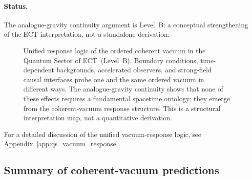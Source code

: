 \paragraph{Status.}
The analogue-gravity continuity argument is Level~B: a conceptual
strengthening of the ECT interpretation, not a standalone derivation.

\begin{figure}[h]
\centering
{}
\caption{Unified response logic of the ordered coherent vacuum
in the Quantum Sector of ECT~(Level~B).
Boundary conditions, time-dependent backgrounds, accelerated observers,
and strong-field causal interfaces probe one and the same ordered vacuum
in different ways.
The analogue-gravity continuity shows that none of these effects requires
a fundamental spacetime ontology; they emerge from the coherent-vacuum
response structure.
This is a structural interpretation map, not a quantitative derivation.}
\label{fig:qs_vacuum_unified}
\end{figure}

For a detailed discussion of the unified vacuum-response logic,
see Appendix~\ref{app:qs_vacuum_response}.

\subsection{Summary of coherent-vacuum predictions}
\label{sec:qs_vacuum_summary}

